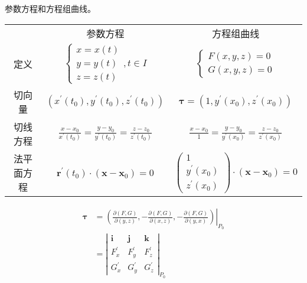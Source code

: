 \documentclass{ctexbook}
\begin{document}
\begin{proposition}[空间曲线的切线与法平面]

    参数方程和方程组曲线。
        
    \begin{tabular}{ccc}
            & 参数方程 & 方程组曲线 \\
        定义  & $\begin{cases}
            x=x(t)\\
            y=y(t)\\
            z=z(t)
        \end{cases},t\in I$ & $\begin{cases}
            F(x,y,z)=0\\
            G(x,y,z)=0
        \end{cases}$\\
        切向量 & $(x^\prime(t_0), y^\prime(t_0), z^\prime(t_0))$ & $\boldsymbol{\tau}=(1,y^\prime (x_0),z^\prime (x_0))$\\
        切线方程 & $\frac{x-x_0}{x^\prime (t_0)}=\frac{y-y_0}{y^\prime(t_0)}=\frac{z-z_0}{z^\prime (t_0)}$ & $\frac{x-x_0}{1}=\frac{y-y_0}{y^\prime(x_0)}=\frac{z-z_0}{z^\prime (x_0)}$ \\
        法平面方程 & $\boldsymbol{r}^\prime(t_0)\cdot(\boldsymbol{x}-\boldsymbol{x}_0)=0$ & $\begin{pmatrix}
            1 \\ y^\prime(x_0) \\ z^\prime(x_0)
        \end{pmatrix}\cdot(\boldsymbol{x}-\boldsymbol{x}_0)=0$
    \end{tabular}

    \begin{equation}
        \begin{aligned}
            \boldsymbol{\tau}&=\left.\left(\frac{\partial(F,G)}{\partial(y,z)},-\frac{\partial(F,G)}{\partial(x,z)},-\frac{\partial(F,G)}{\partial(y,x)}\right)\right|_{P_0}\\
            &=\left|\begin{matrix}\boldsymbol{i}&\boldsymbol{j}&\boldsymbol{k}\\F_x^\prime&F_y^\prime&F_z^\prime\\G_x^\prime&G_y^\prime&G_z^\prime\end{matrix}\right|_{P_0}
        \end{aligned}
    \end{equation}
\end{proposition}
\end{document}
